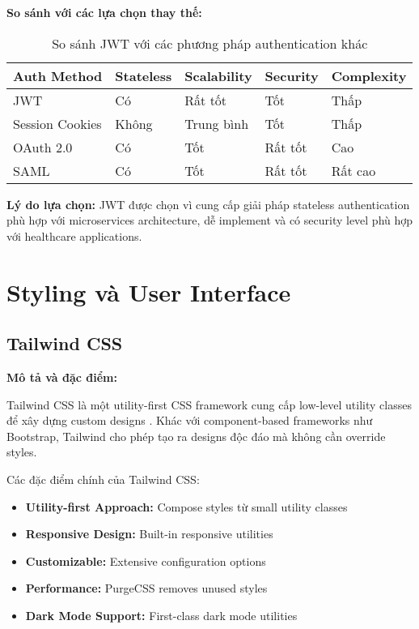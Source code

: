 \documentclass[../DoAn.tex]{subfiles}
\begin{document}
\textbf{So sánh với các lựa chọn thay thế:}

\begin{table}[H]
\centering
\begin{tabular}{|p{3cm}|p{2.5cm}|p{2.5cm}|p{2.5cm}|p{2.5cm}|}
\hline
\textbf{Auth Method} & \textbf{Stateless} & \textbf{Scalability} & \textbf{Security} & \textbf{Complexity} \\
\hline
JWT & Có & Rất tốt & Tốt & Thấp \\
\hline
Session Cookies & Không & Trung bình & Tốt & Thấp \\
\hline
OAuth 2.0 & Có & Tốt & Rất tốt & Cao \\
\hline
SAML & Có & Tốt & Rất tốt & Rất cao \\
\hline
\end{tabular}
\caption{So sánh JWT với các phương pháp authentication khác}
\end{table}

\textbf{Lý do lựa chọn:} JWT được chọn vì cung cấp giải pháp stateless authentication phù hợp với microservices architecture, dễ implement và có security level phù hợp với healthcare applications.

\section{Styling và User Interface}
\label{section:3.6}

\subsection{Tailwind CSS}
\label{subsection:3.6.1}

\textbf{Mô tả và đặc điểm:}

Tailwind CSS là một utility-first CSS framework cung cấp low-level utility classes để xây dựng custom designs \cite{tailwind}. Khác với component-based frameworks như Bootstrap, Tailwind cho phép tạo ra designs độc đáo mà không cần override styles.

Các đặc điểm chính của Tailwind CSS:
\begin{itemize}
    \item \textbf{Utility-first Approach:} Compose styles từ small utility classes
    \item \textbf{Responsive Design:} Built-in responsive utilities
    \item \textbf{Customizable:} Extensive configuration options
    \item \textbf{Performance:} PurgeCSS removes unused styles
    \item \textbf{Dark Mode Support:} First-class dark mode utilities
\end{itemize}
\end{document}
